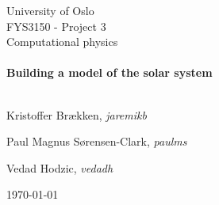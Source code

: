 
\begin{center}
    \LARGE University of Oslo\\[1.5cm]
    \Large FYS3150 - Project 3 \\ Computational physics\\[0.5cm]

    \HRule \\[0.4cm]

    { \huge \bfseries Building a model of the solar system\\[0.4cm] }

    \HRule \\[1.5cm]

    \large Kristoffer Brækken, \emph{jaremikb}

    \large Paul Magnus Sørensen-Clark, \emph{paulms}

    \large Vedad Hodzic, \emph{vedadh}

    \vfill

    {\large \today}
\end{center}
